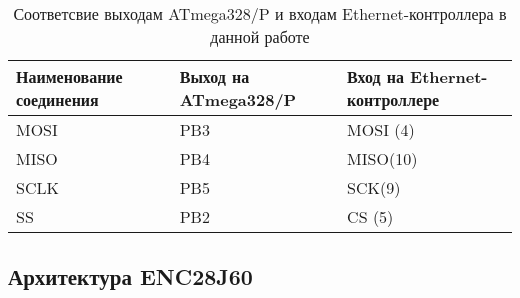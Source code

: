 \begin{table}[h!]
\caption{Соответсвие выходам ATmega328/P и входам Ethernet-контроллера в данной работе}
\label{connection}
	\begin{tabular}{|p{40mm}|p{40mm}|p{40mm}|}
\hline
	Наименование соединения & Выход на ATmega328/P & Вход на Ethernet-контроллере \\
\hline
		MOSI & PB3 & MOSI (4)\\
\hline
		MISO & PB4 & MISO(10)\\
\hline
		SCLK & PB5 & SCK(9)\\
\hline
		SS & PB2 & CS (5)\\
\hline
\end{tabular}
\end{table}


\subsection{Архитектура ENC28J60}


